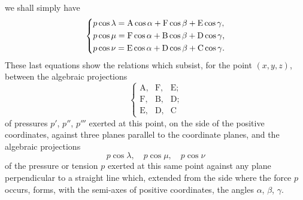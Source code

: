 \documentclass[leqno,openright,smallroyalvopaper,8pt,twoside,showtrims]{memoir}
\begin{document}
 we shall simply have 
\begin{equation}\label{eq:matriz}
   \begin{dcases}
p\cos\lambda = \text{A}\cos\alpha+\text{F}\cos\beta+\text{E}\cos\gamma,\\
p\cos\mu = \text{F}\cos\alpha+\text{B}\cos\beta+\text{D}\cos\gamma,\\
p\cos\nu = \text{E}\cos\alpha+\text{D}\cos\beta+\text{C}\cos\gamma.
    \end{dcases}
 \end{equation}
These last equations show the relations which subsist, for the point $(x, y, z)$, between the algebraic projections
\begin{equation}\left\{
   \begin{array}{ccc}
\text{A}, & \text{F}, & \text{E};\\
\text{F}, & \text{B}, & \text{D};\\
\text{E}, & \text{D}, & \text{C}
    \end{array}\right.
 \end{equation}
 of pressures $p'$, $p''$, $p'''$ exerted at this point, on the side of the positive coordinates, against three planes parallel to the coordinate planes, and the algebraic projections
\begin{equation*}
p\cos\lambda,\quad p\cos\mu,\quad p\cos\nu
\end{equation*}
of the pressure or tension $p$ exerted at this same point against any plane perpendicular to a straight line which, extended from the side where the force $p$ occurs, forms, with the semi-axes of positive coordinates, the angles $\alpha$, $\beta$, $\gamma$. 
\end{document}
